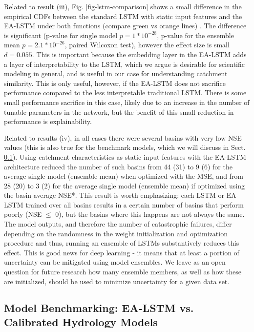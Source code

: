 Related to result (iii), Fig. \ref{fig-lstm-comparison} shows a small difference in the empirical CDFs between the standard \gls{LSTM} with static input features and the \gls{EA-LSTM} under both functions (compare green vs orange lines) . The difference is significant (p-value for single model $p=1*10^{-28}$, p-value for the ensemble mean $p=2.1*10^{-26}$, paired Wilcoxon test), however the effect size is small $d=0.055$. This is important because the embedding layer in the \gls{EA-LSTM} adds a layer of interpretability to the \gls{LSTM}, which we argue is desirable for scientific modeling in general, and is useful in our case for understanding catchment similarity. This is only useful, however, if the \gls{EA-LSTM} does not sacrifice performance compared to the less interpretable traditional \gls{LSTM}. There is some small performance sacrifice in this case, likely due to an increase in the number of tunable parameters in the network, but the benefit of this small reduction in performance is explainability. 

Related to results (iv), in all cases there were several basins with very low \gls{NSE} values (this is also true for the benchmark models, which we will discuss in Sect. \ref{sec-benchmarking}). 
Using catchment characteristics as static input features with the \gls{EA-LSTM} architecture reduced the number of such basins from 44 (31) to 9 (6) for the average single model (ensemble mean) when optimized with the \gls{MSE}, and from 28 (20) to 3 (2) for the average single model (ensemble mean) if optimized using the basin-average \gls{NSE*}. 
This result is worth emphasizing: each \gls{LSTM} or \gls{EA-LSTM} trained over all basins results in a certain number of basins that perform poorly (\gls{NSE} $\leq$ 0), but the basins where this happens are not always the same. The model outputs, and therefore the number of catastrophic failures, differ depending on the randomness in the weight initialization and optimization procedure and thus, running an ensemble of \glspl{LSTM} substantively reduces this effect. This is good news for deep learning - it means that at least a portion of uncertainty can be mitigated using model ensembles. We leave as an open question for future research how many ensemble members, as well as how these are initialized, should be used to minimize uncertainty for a given data set.  

\subsection{Model Benchmarking: EA-LSTM vs. Calibrated Hydrology Models}\label{sec-benchmarking}


